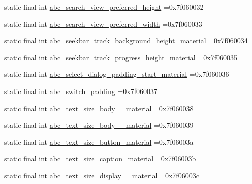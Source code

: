 \begin{DoxyCompactItemize}
\item 
static final int \mbox{\hyperlink{classbr_1_1unb_1_1cic_1_1mp_1_1marketmaster_1_1test_1_1R_1_1dimen_a9f60ae690d65f5b1cfa366dffbff53fd}{abc\+\_\+search\+\_\+view\+\_\+preferred\+\_\+height}} =0x7f060032
\item 
static final int \mbox{\hyperlink{classbr_1_1unb_1_1cic_1_1mp_1_1marketmaster_1_1test_1_1R_1_1dimen_a071dfdbfd20e275e3f7431ce2e552ff9}{abc\+\_\+search\+\_\+view\+\_\+preferred\+\_\+width}} =0x7f060033
\item 
static final int \mbox{\hyperlink{classbr_1_1unb_1_1cic_1_1mp_1_1marketmaster_1_1test_1_1R_1_1dimen_a128937dfa13b666ff490da7c37c3fc86}{abc\+\_\+seekbar\+\_\+track\+\_\+background\+\_\+height\+\_\+material}} =0x7f060034
\item 
static final int \mbox{\hyperlink{classbr_1_1unb_1_1cic_1_1mp_1_1marketmaster_1_1test_1_1R_1_1dimen_a02c2b1b84920edf4a04605693b1dc37d}{abc\+\_\+seekbar\+\_\+track\+\_\+progress\+\_\+height\+\_\+material}} =0x7f060035
\item 
static final int \mbox{\hyperlink{classbr_1_1unb_1_1cic_1_1mp_1_1marketmaster_1_1test_1_1R_1_1dimen_aa0bd8b24765f1aa468228e02fc547087}{abc\+\_\+select\+\_\+dialog\+\_\+padding\+\_\+start\+\_\+material}} =0x7f060036
\item 
static final int \mbox{\hyperlink{classbr_1_1unb_1_1cic_1_1mp_1_1marketmaster_1_1test_1_1R_1_1dimen_a403fdc6c69107e8bc3e0cb429ada7e83}{abc\+\_\+switch\+\_\+padding}} =0x7f060037
\item 
static final int \mbox{\hyperlink{classbr_1_1unb_1_1cic_1_1mp_1_1marketmaster_1_1test_1_1R_1_1dimen_a7633200a3ab2bdaf1d62d62793205a3c}{abc\+\_\+text\+\_\+size\+\_\+body\+\_\+\_\+material}} =0x7f060038
\item 
static final int \mbox{\hyperlink{classbr_1_1unb_1_1cic_1_1mp_1_1marketmaster_1_1test_1_1R_1_1dimen_a0b42eb73313bc0d7b714c0618d27cdee}{abc\+\_\+text\+\_\+size\+\_\+body\+\_\+\_\+material}} =0x7f060039
\item 
static final int \mbox{\hyperlink{classbr_1_1unb_1_1cic_1_1mp_1_1marketmaster_1_1test_1_1R_1_1dimen_a41c0063459f9b0d41b3fc27ea6ad2c2f}{abc\+\_\+text\+\_\+size\+\_\+button\+\_\+material}} =0x7f06003a
\item 
static final int \mbox{\hyperlink{classbr_1_1unb_1_1cic_1_1mp_1_1marketmaster_1_1test_1_1R_1_1dimen_a1bad556ab9c989c14e9aa7e0ed7d3485}{abc\+\_\+text\+\_\+size\+\_\+caption\+\_\+material}} =0x7f06003b
\item 
static final int \mbox{\hyperlink{classbr_1_1unb_1_1cic_1_1mp_1_1marketmaster_1_1test_1_1R_1_1dimen_a76d53d2ea4b0d8be8df4d40496215cfb}{abc\+\_\+text\+\_\+size\+\_\+display\+\_\+\_\+material}} =0x7f06003c

\end{DoxyCompactItemize}
